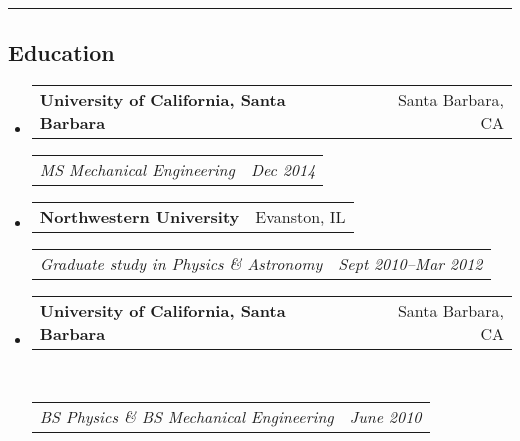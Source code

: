 \documentclass[10pt,letterpaper]{article}
\makeatletter
\newcommand{\headerrow}[2]
{\begin{tabular*}{\linewidth}{l@{\extracolsep{\fill}}r}
	#1 &
	#2 \\
\end{tabular*}}
\makeatother
\begin{document}
\hrule
\subsection*{Education}
\begin{itemize}
	\parskip=-0.1em
	\item 
	\headerrow
		{\textbf{University of California, Santa Barbara}}
		{Santa Barbara, CA}
	\headerrow
		{\emph{MS  Mechanical Engineering}}
		{\emph{Dec 2014}}
	\item 
	\headerrow
		{\textbf{Northwestern University}}
		{Evanston, IL}
	\headerrow
		{\emph{Graduate study in Physics \& Astronomy}}
		{\emph{Sept 2010--Mar 2012}}
	\item 
	\headerrow
		{\textbf{University of California, Santa Barbara}}
		{Santa Barbara, CA}	\\
	\headerrow
		{\emph{BS Physics \&  BS Mechanical Engineering}}
		{\emph{June 2010}}
\end{itemize}
\end{document}
